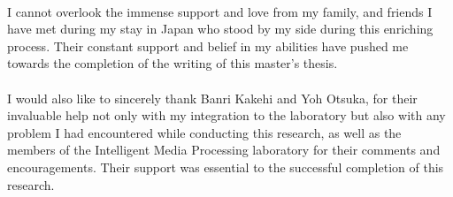 \documentclass[12pt, letterpaper]{article}
\begin{document}
\paragraph{}
I cannot overlook the immense support and love from my family, and friends I have met during my stay in Japan who
stood by my side during this enriching process. Their constant support and belief in my abilities have pushed me towards the completion of the writing of this master's thesis.
\paragraph{}
I would also like to sincerely thank Banri Kakehi and Yoh Otsuka, for their invaluable help not only with my integration to the laboratory but also with any problem I had encountered while
conducting this research, as well as the members of the Intelligent Media Processing laboratory for their comments and encouragements.
Their support was essential to the successful completion of this research.

\newpage




\tableofcontents{}
\newpage
\end{document}
